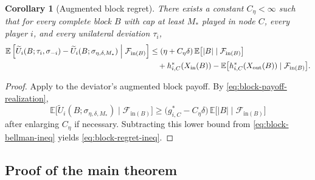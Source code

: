 \documentclass[12pt]{article}
\newtheorem{corollary}[theorem]{Corollary}
\theoremstyle{definition}
\newcommand{\E}{\mathbb{E}}
\newcommand{\1}{\mathbf{1}}
\newcommand{\cF}{\mathcal{F}}
\begin{document}
\begin{corollary}[Augmented block regret]
\label{cor:block-regret}
There exists a constant $C_\eta<\infty$ such that for every complete block $B$
with cap at least $M_*$ played in node $C$, every player $i$, and every unilateral
deviation $\tau_i$,
\begin{equation}
\label{eq:block-regret-ineq}
\begin{aligned}
\E\left[
\widetilde U_i(B;\tau_i,\sigma_{-i})
-
\widetilde U_i(B;\sigma_{\eta,\delta,M_*})
\Bigm|\cF_{\mathrm{in}(B)}
\right]
&\le
(\eta+C_\eta\delta)\,\E\bigl[|B|\mid\cF_{\mathrm{in}(B)}\bigr]
\\
&\quad+
h_{i,C}^*(X_{\mathrm{in}}(B))
-
\E\bigl[h_{i,C}^*(X_{\mathrm{out}}(B))\mid\cF_{\mathrm{in}(B)}\bigr].
\end{aligned}
\end{equation}
\end{corollary}

\begin{proof}
Apply  to the deviator's augmented block payoff. By
\eqref{eq:block-payoff-realization},
\[
\E\bigl[\widetilde U_i(B;\sigma_{\eta,\delta,M_*})\mid\cF_{\mathrm{in}(B)}\bigr]
\ge
\bigl(g_{i,C}^*-C_\eta\delta\bigr)\,
\E\bigl[|B|\mid\cF_{\mathrm{in}(B)}\bigr]
\]
after enlarging $C_\eta$ if necessary. Subtracting this lower bound from
\eqref{eq:block-bellman-ineq} yields \eqref{eq:block-regret-ineq}.
\end{proof}

\subsection{Proof of the main theorem}
\end{document}

